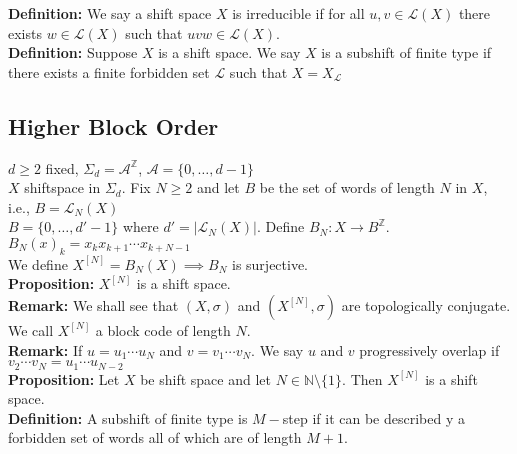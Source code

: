\documentclass[12pt]{article}
\begin{document}
\textbf{Definition:} We say a shift space $X$ is irreducible if for all $u, v \in \mathcal{L}(X)$ there exists $w \in \mathcal{L}(X)$ such that $uvw \in \mathcal{L}(X)$.\\

\textbf{Definition:} Suppose $X$ is a shift space. We say $X$ is a subshift of finite type if there exists a finite forbidden set $\mathcal{L}$ such that $X = X_{\mathcal{L}}$

\subsection{Higher Block Order}

$d \geq 2$ fixed, $\Sigma_d = \mathcal{A}^{\mathbb{Z}}$, $\mathcal{A} = \{0, \ldots, d-1\}$\\

$X$ shiftspace in $\Sigma_d$. Fix $N \geq 2$ and let $B$ be the set of words of length $N$ in $X$, i.e., $B = \mathcal{L}_N(X)$\\

$B = \{0, \ldots, d'-1\}$ where $d' = |\mathcal{L}_N(X)|$. Define $B_N: X \to B^{\mathbb{Z}}$.\\

$B_N(x)_k = x_kx_{k+1} \cdots x_{k+N-1}$\\

We define $X^{[N]} = B_N(X) \implies B_N$ is surjective.\\

\textbf{Proposition:} $X^{[N]}$ is a shift space.\\

\textbf{Remark:} We shall see that $(X, \sigma)$ and $(X^{[N]}, \sigma)$ are topologically conjugate.\\

We call $X^{[N]}$ a block code of length $N$.\\

\textbf{Remark:} If $u = u_1 \cdots u_N$ and $v = v_1 \cdots v_N$. We say $u$ and $v$ progressively overlap if $v_2 \cdots v_N = u_1 \cdots u_{N-2}$\\

\textbf{Proposition:} Let $X$ be shift space and let $N \in \mathbb{N} \setminus \{1\}$. Then $X^{[N]}$ is a shift space.\\

\textbf{Definition:} A subshift of finite type is $M-$step if it can be described y a forbidden set of words all of which are of length $M+1$.\\
\end{document}
